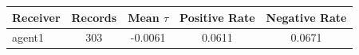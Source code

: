 \begin{tabular}{lcccc}
\toprule
Receiver & Records & Mean $\tau$ & Positive Rate & Negative Rate \\
\midrule
agent1 & 303 & -0.0061 & 0.0611 & 0.0671 \\
\bottomrule
\end{tabular}
